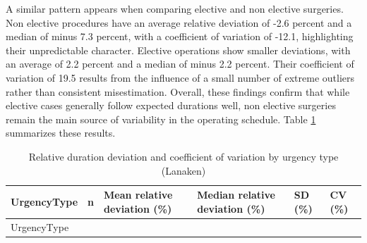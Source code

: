 \documentclass[
]{article}
\begin{document}
A similar pattern appears when comparing elective and non elective
surgeries. Non elective procedures have an average relative deviation of
-2.6 percent and a median of minus 7.3 percent, with a coefficient of
variation of -12.1, highlighting their unpredictable character. Elective
operations show smaller deviations, with an average of 2.2 percent and a
median of minus 2.2 percent. Their coefficient of variation of 19.5
results from the influence of a small number of extreme outliers rather
than consistent misestimation. Overall, these findings confirm that
while elective cases generally follow expected durations well, non
elective surgeries remain the main source of variability in the
operating schedule. Table \ref{tab:rel_dev_urgency} summarizes these
results.

\begin{longtable}[]{@{}
  >{\centering\arraybackslash}p{}
  >{\centering\arraybackslash}p{}
  >{\centering\arraybackslash}p{}
  >{\centering\arraybackslash}p{}
  >{\centering\arraybackslash}p{}
  >{\centering\arraybackslash}p{}@{}}
\caption{Relative duration deviation and coefficient of variation by
urgency type (Lanaken) \label{tab:rel_dev_urgency}}\tabularnewline
\toprule\noalign{}
\begin{minipage}[b]{\linewidth}\centering
UrgencyType
\end{minipage} & \begin{minipage}[b]{\linewidth}\centering
n
\end{minipage} & \begin{minipage}[b]{\linewidth}\centering
Mean relative deviation (\%)
\end{minipage} & \begin{minipage}[b]{\linewidth}\centering
Median relative deviation (\%)
\end{minipage} & \begin{minipage}[b]{\linewidth}\centering
SD (\%)
\end{minipage} & \begin{minipage}[b]{\linewidth}\centering
CV (\%)
\end{minipage} \\
\midrule\noalign{}
\endfirsthead
\toprule\noalign{}
\begin{minipage}[b]{\linewidth}\centering
UrgencyType

\end{minipage}
\end{longtable}
\end{document}
